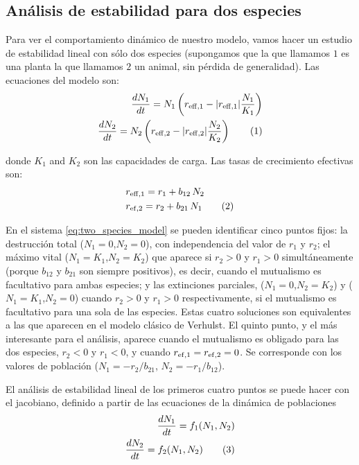 \subsection{Análisis de estabilidad para dos especies}

Para ver el comportamiento dinámico de nuestro modelo, vamos hacer un estudio de estabilidad lineal con sólo dos especies (supongamos que la que llamamos $1$ es una planta la que llamamos $2$ un animal, sin pérdida de generalidad). Las ecuaciones del modelo son:
\begin{align*}
\displaystyle \frac{dN_1}{dt}= N_1 \left( r_{\rm{eff},1} - |r_{\rm{eff},1}| \frac{N_1}{K_1} \right) \\
\displaystyle \frac{dN_2}{dt}= N_2 \left( r_{\rm{eff},2} - |r_{\rm{eff},2}| \frac{N_2}{K_2} \right)
\stepcounter{equation}\tag{\theequation}\label{eq:two_species_model}
\end{align*}

\noindent donde $K_1$ and $K_2$ son las capacidades de carga. Las tasas de crecimiento efectivas son:
\begin{align*}
\displaystyle &r_{\rm{eff},1} = r_{1} + b_{12}\, N_2 \\
\displaystyle &r_{\rm{ef},2} = r_{2} + b_{21}\, N_1
\stepcounter{equation}\tag{\theequation}\label{eq:two_species_reff}
\end{align*}

En el sistema \ref{eq:two_species_model} se pueden identificar cinco puntos fijos:
la destrucción total ($N_1=0$,$N_2=0$), con independencia del valor de $r_{1}$ y $r_{2}$;
el máximo vital ($N_1=K_1$,$N_2=K_2$) que aparece si $r_{2}>0$ y $r_{1}>0$ simultáneamente (porque $b_{12}$ y $b_{21}$ son siempre positivos), es decir, cuando el mutualismo es facultativo para ambas especies; y las extinciones parciales, ($N_1=0$,$N_2=K_2$)
y ($N_1=K_1$,$N_2=0$) cuando $r_{2}>0$ y $r_{1}>0$ respectivamente, si el mutualismo es facultativo para una sola de las especies. Estas cuatro soluciones son equivalentes a las que aparecen en el modelo clásico de Verhulst. El quinto punto, y el más interesante para el análisis, aparece cuando el mutualismo es obligado para las dos especies, $r_{2}<0$ y $r_{1}<0$, y cuando $r_{\rm{ef},1}=r_{\rm{ef},2}=0$. Se corresponde con los valores de población ($N_1={-r_{2}}/{b_{21}}$, $N_2={-r_{1}}/{b_{12}}$).

El análisis de estabilidad lineal de los primeros cuatro puntos se puede hacer con el jacobiano, definido a partir de las ecuaciones de la dinámica de poblaciones
\begin{align*}
 \frac{dN_1}{dt} = f_1(N_1,N_2) \\
 \frac{dN_2}{dt} = f_2(N_1,N_2)
\stepcounter{equation}\tag{\theequation}\label{eq:Jacob00}
\end{align*}

